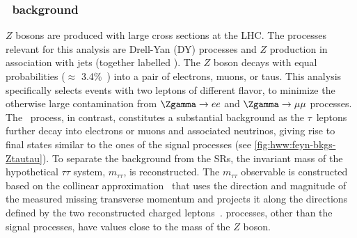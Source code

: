 \subsubsection{\Ztautau\ background}
$Z$ bosons are produced with large cross sections at the LHC. The processes relevant for this analysis are Drell-Yan (DY) processes and $Z$ production in association with jets (together labelled \Zgamma).
The $Z$ boson decays with equal probabilities ($\approx$ 3.4\%~\cite{PDG2020}) into a pair of electrons, muons, or taus. 
This analysis specifically selects events with two leptons of different flavor, to minimize the otherwise large contamination from $\Zgamma \to ee$ and $\Zgamma \to \mu\mu$ processes. 
The \Ztautau\ process, in contrast, constitutes a substantial background as the $\tau$~leptons further decay into electrons or muons and associated neutrinos, giving rise to final states similar to the ones of the signal processes (see \cref{fig:hww:feyn-bkgs-Ztautau}). 
To separate the \Ztautau background from the SRs, the invariant mass of the hypothetical $\tau\tau$ system, $m_{\tau\tau}$, is reconstructed.
The $m_{\tau\tau}$ observable is constructed based on the collinear approximation~\cite{Plehn:1999xi} that uses the direction and magnitude of the measured missing transverse momentum and projects it along the directions defined by the two reconstructed charged leptons~\cite{HWWPaper}.
\Zgamma processes, other than the signal processes, have \mtt values close to the mass of the $Z$ boson.

